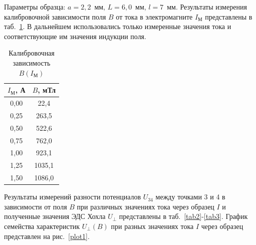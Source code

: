 \documentclass[a4paper,12pt]{article} %
\begin{document}
Параметры образца: $a = 2,2$~мм, $L = 6,0$~мм, $l = 7$~мм. Результаты измерения калибровочной зависимости поля $B$ от тока в электромагните $I_М$ представлены в таб.~\ref{tab1}. В дальнейшем использовались только измеренные значения тока и соответствующие им значения индукции поля. 

\begin{table}[h!]
\begin{center}
\begin{tabular}{|c|c|}
\hline
$I_М$, А & $B$, мТл \\ \hline
0,00 & 22,4 \\ \hline
0,25 & 263,5 \\ \hline
0,50 & 522,6 \\ \hline
0,75 & 762,0 \\ \hline
1,00 & 923,1 \\ \hline
1,25 & 1035,1 \\ \hline
1,50 & 1086,0 \\ \hline
\end{tabular}
\end{center}
\caption{Калибровочная зависимость $B(I_\text{М})$}
\label{tab1}
\end{table}

Результаты измерений разности потенциалов $U_{34}$ между точками 3 и 4 в зависимости от поля $B$ при различных значениях тока через образец $I$ и полученные значения ЭДС Хохла $U_{\perp}$ представлены в таб.~\ref{tab2}-\ref{tab3}. График семейства характеристик $U_{\perp}(B)$ при разных значениях тока $I$ через образец представлен на рис.~\ref{plot1}.
\end{document}
